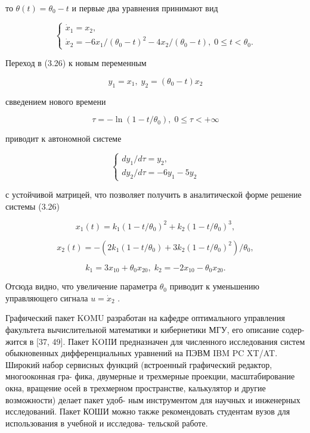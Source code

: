 \documentclass[10pt]{article}
\begin{document}
то \(\theta \left( t\right)  = {\theta }_{0} - t\) и первые два уравнения принимают вид

\[
\left\{  \begin{array}{l} {\dot{x}}_{1} = {x}_{2}, \\  {\dot{x}}_{2} =  - 6{x}_{1}/{\left( {\theta }_{0} - t\right) }^{2} - 4{x}_{2}/\left( {{\theta }_{0} - t}\right) ,\;0 \leq  t < {\theta }_{0}. \end{array}\right. \tag{3.26}
\]

Переход в (3.26) к новым переменным

\[
{y}_{1} = {x}_{1},\;{y}_{2} = \left( {{\theta }_{0} - t}\right) {x}_{2}
\]

свведением нового времени

\[
\tau  =  - \ln \left( {1 - t/{\theta }_{0}}\right) ,\;0 \leq  \tau  <  + \infty
\]

приводит к автономной системе

\[
\left\{  \begin{array}{l} d{y}_{1}/{d\tau } = {y}_{2}, \\  d{y}_{2}/{d\tau } =  - 6{y}_{1} - 5{y}_{2} \end{array}\right.
\]

с устойчивой матрицей, что позволяет получить в аналитической форме решение системы (3.26)

\[
{x}_{1}\left( t\right)  = {k}_{1}{\left( 1 - t/{\theta }_{0}\right) }^{2} + {k}_{2}{\left( 1 - t/{\theta }_{0}\right) }^{3},
\]

\[
{x}_{2}\left( t\right)  =  - \left( {2{k}_{1}\left( {1 - t/{\theta }_{0}}\right)  + 3{k}_{2}{\left( 1 - t/{\theta }_{0}\right) }^{2}}\right) /{\theta }_{0},
\]

\[
{k}_{1} = 3{x}_{10} + {\theta }_{0}{x}_{20},\;{k}_{2} =  - 2{x}_{10} - {\theta }_{0}{x}_{20}.
\]

Отсюда видно, что увеличение параметра \({\theta }_{0}\) приводит к уменьшению управляющего сигнала \(u = {\dot{x}}_{2}\) .

Графический пакет KOMU разработан на кафедре оптимального управления факультета вычислительной математики и кибернетики МГУ, его описание содер- жится в [37, 49]. Пакет KOIIИ предназначен для численного исследования систем обыкновенных дифференциальных уравнений на ПЭВМ IBM PC XT/AT. Широкий набор сервисных функций (встроенный графический редактор, многооконная гра- фика, двумерные и трехмерные проекции, масштабирование окна, вращение осей в трехмерном пространстве, калькулятор и другие возможности) делает пакет удоб- ным инструментом для научных и инженерных исследований. Пакет КОШИ можно также рекомендовать студентам вузов для использования в учебной и исследова- тельской работе.
\end{document}
